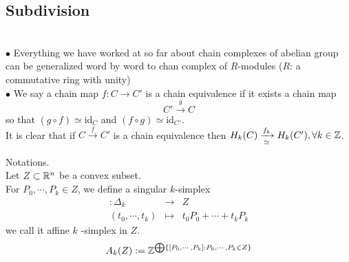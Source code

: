 \documentclass{article}
\begin{document}
\subsection{Subdivision}
\begin{remark}
    \quad \\
    $\bullet$ Everything we have worked at so far about chain complexes of abelian group can be generalized word by word to chan complex of $R$-modules ($R$: a commutative ring with unity)\\
    $\bullet$ We say a chain map $f : C \to C'$ is a chain equivalence if it exists a chain map
    $$
    C' \xrightarrow{g} C
    $$
    so that $(g \circ f)\simeq \text{id}_{C}$ and $(f \circ g) \simeq \text{id}_{C'}$.\\
    It is clear that if $C\xrightarrow{f} C'$ is a chain equivalence then $H_k(C) \xrightarrow[\simeq]{f_k} H_k(C'),\forall k \in \mathbb{Z}$.
\end{remark}
Notations.\\
Let $Z\subset \mathbb{R}^n$ be a convex subset.\\
For $P_0,\cdots,P_k\in Z$, we define a singular $k$-simplex 
\begin{eqnarray*}
    [P_0,\cdots,P_k] : \Delta_k &\to& Z\\
    (t_0,\cdots,t_k) &\mapsto& t_0P_0+\cdots+t_kP_k
\end{eqnarray*}
we call it affine $k$ -simplex in $Z$.\\
$$
A_k(Z) := \mathbb{Z}^{\bigoplus \{[P_0,\cdots,P_k]:P_0,\cdots,P_k\in Z\}}
$$
\newpage


\end{document}
